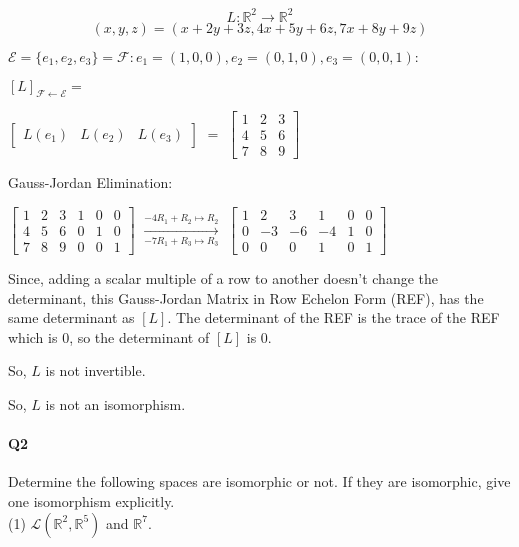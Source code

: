 \documentclass{article}
\begin{document}
\[L:\mathbb{R}^2 \rightarrow \mathbb{R}^2\]
\[(x,y,z) = (x+2y+3z,4x+5y+6z,7x+8y+9z)\]

$\mathcal{E}=\{e_1,e_2,e_3\}=\mathcal{F}: e_1 = (1,0,0), e_2 =
(0,1,0), e_3 = (0,0,1):$

$[ L ]_{\mathcal{F} \leftarrow \mathcal{E}} =$

$\left[
  \begin{array}{c|c|c}
    L(e_1)&L(e_2)&L(e_3)
  \end{array}
\right]
$
$=$
$
\begin{bmatrix}
  1&2&3\\
  4&5&6\\
  7&8&9
\end{bmatrix}
$

Gauss-Jordan Elimination:

$\left[
  \begin{array}{ccc|ccc}
  1&2&3&1&0&0\\
  4&5&6&0&1&0\\
  7&8&9&0&0&1
  \end{array}
\right]
$
$\xrightarrow[-7R_1+R_3 \mapsto R_3]{-4R_1+R_2 \mapsto R_2}
$
$
$
$\left[
  \begin{array}{ccc|ccc}
  1&2&3&1&0&0\\
  0&-3&-6&-4&1&0\\
  0&0&0&1&0&1
  \end{array}
\right]
$

Since, adding a scalar multiple of a row to another doesn't
change the determinant, this Gauss-Jordan Matrix in Row Echelon Form (REF),
has the same determinant as $[L]$. The determinant of the REF is the
trace of the REF which is $0$, so the determinant of $[L]$ is $0$.

So, $L$ is not invertible.

So, $L$ is not an isomorphism.

\paragraph{Q2} Determine the following spaces are isomorphic or not. If they are
isomorphic, give one isomorphism explicitly.\\

(1) $\mathcal{L}(\mathbb{R}^2 , \mathbb{R}^5)$ and $\mathbb{R}^7.$
\end{document}
